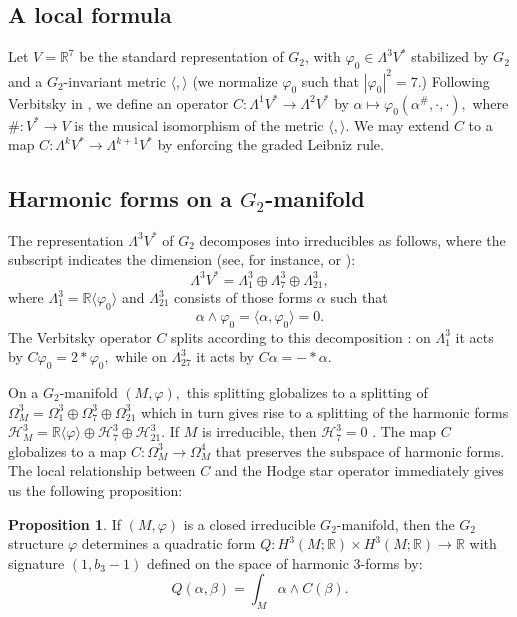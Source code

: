 \documentclass{amsart}
\theoremstyle{theorem}
\theoremstyle{definition}
\theoremstyle{definition}
\theoremstyle{definition}
\theoremstyle{theorem}
\theoremstyle{theorem}
\newtheorem{proposition}[theorem]{Proposition}
\theoremstyle{theorem}
\theoremstyle{corollary}
\theoremstyle{question}
\theoremstyle{remark}
\begin{document}
\subsection{A local formula}

Let $V = \mathbb{R}^7$ be the standard representation of $G_2$, with $\varphi_0\in\Lambda^3 V^*$ stabilized by $G_2$ and a $G_2$-invariant metric $\langle, \rangle$ (we normalize $\varphi_0$ such that $|\varphi_0|^2 = 7.$) Following Verbitsky in \cite{Verbitsky}, we define an operator $C:\Lambda^1V^*\to\Lambda^2V^*$ by $\alpha\mapsto \varphi_0(\alpha^\#, \cdot, \cdot),$ where $\#:V^*\to V$ is the musical isomorphism of the metric $\langle, \rangle.$ We may extend $C$ to a map $C:\Lambda^kV^*\to\Lambda^{k+1}V^*$ by enforcing the graded Leibniz rule.

\subsection{Harmonic forms on a $G_2$-manifold} 

The representation $\Lambda^3V^*$ of $G_2$ decomposes into irreducibles as follows, where the subscript indicates the dimension (see, for instance, \cite{Bryant} or \cite{Joyce1}): $$\Lambda^3V^* = \Lambda^3_1\oplus\Lambda^3_7\oplus\Lambda^3_{21},$$ where $\Lambda^3_1=\mathbb{R}\langle\varphi_0\rangle$ and $\Lambda^3_{21}$ consists of those forms $\alpha$ such that $$\alpha\wedge\varphi_0=\langle\alpha,\varphi_0\rangle = 0.$$ The Verbitsky operator $C$ splits according to this decomposition \cite[Claim 3.11, Remark 3.12]{Verbitsky}: on $\Lambda^3_1$ it acts by $C\varphi_0 = 2*\varphi_0,$ while on $\Lambda^3_{27}$ it acts by $C\alpha = -*\alpha.$ 

On a $G_2$-manifold $(M, \varphi),$ this splitting globalizes to a splitting of $\Omega^3_M=\Omega^3_1\oplus\Omega^3_7\oplus\Omega^3_{21}$ which in turn gives rise to a splitting of the harmonic forms $\mathcal{H}^3_M = \mathbb{R}\langle\varphi\rangle\oplus\mathcal{H}^3_7\oplus\mathcal{H}^3_{21}$. If $M$ is irreducible, then $\mathcal{H}^3_7 = 0$ \cite[Theorem 10.2.4]{Joycebook}. The map $C$ globalizes to a map $C:\Omega^3_M\to\Omega^{4}_M$ that preserves the subspace of harmonic forms. The local relationship between $C$ and the Hodge star operator immediately gives us the following proposition:

\begin{proposition}
    If $(M, \varphi)$ is a closed irreducible $G_2$-manifold, then the $G_2$ structure $\varphi$ determines a quadratic form $Q:H^3(M; \mathbb{R})\times H^3(M; \mathbb{R})\to\mathbb{R}$ with signature $(1, b_3-1)$ defined on the space of harmonic 3-forms by: $$Q(\alpha,\beta) = \int_M\alpha\wedge C(\beta).$$
\end{proposition}
\end{document}
